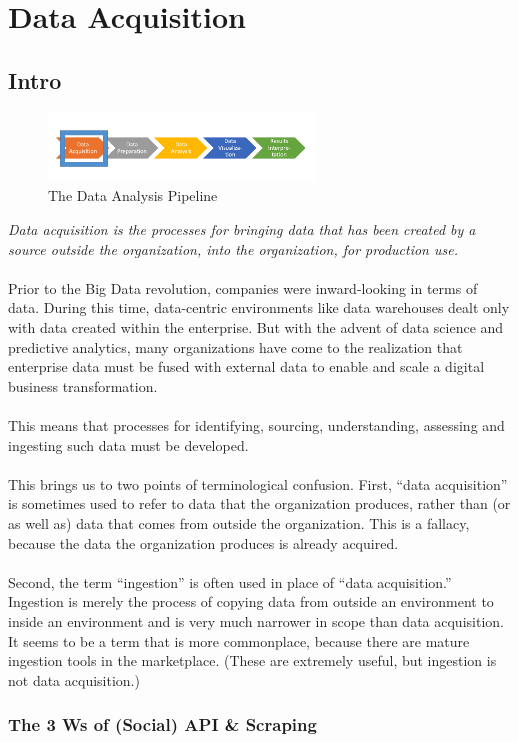 \documentclass[10pt,a4paper]{article}
\newcommand{\nline}{\\~\\}
\begin{document}
 \pagebreak

 \section{Data Acquisition}
 \subsection{Intro}
  \begin{figure}[ht!]
 \hfill \includegraphics[width=200pt]{images/data-analysis-pipeline}
 \hspace*{\fill}
\caption{The Data Analysis Pipeline}
 \end{figure}
 \textit{Data acquisition is the processes for bringing data that has been created by a source outside the organization, into the organization, for production use.} \nline
 Prior to the Big Data revolution, companies were inward-looking in terms of data. During this time, data-centric environments like data warehouses dealt only with data created within the enterprise. But with the advent of data science and predictive analytics, many organizations have come to the realization that enterprise data must be fused with external data to enable and scale a digital business transformation.
 \nline
 This means that processes for identifying, sourcing, understanding, assessing and ingesting such data must be developed.
 \nline
 This brings us to two points of terminological confusion. First, “data acquisition” is sometimes used to refer to data that the organization produces, rather than (or as well as) data that comes from outside the organization. This is a fallacy, because the data the organization produces is already acquired.
 \nline
 Second, the term “ingestion” is often used in place of “data acquisition.” Ingestion is merely the process of copying data from outside an environment to inside an environment and is very much narrower in scope than data acquisition. It seems to be a term that is more commonplace, because there are mature ingestion tools in the marketplace. (These are extremely useful, but ingestion is not data acquisition.)
 \subsubsection{The 3 Ws of (Social) API \& Scraping}
\end{document}
